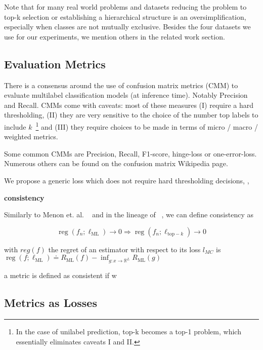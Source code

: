 Note that for many real world problems and datasets reducing the problem to top-k selection or establishing a hierarchical structure is an oversimplification, especially when classes are not mutually exclusive. Besides the four datasets we use for our experiments, we mention others in the related work section.

\subsection{Evaluation Metrics}
\label{section:background:metrics}

There is a consensus around the use of confusion matrix metrics (CMM) to evaluate multilabel classification models (at inference time). Notably Precision and Recall. CMMs come with caveats: most of these measures (I) require a hard thresholding, (II) they are very sensitive to the choice of the number top labels to include $k$~\footnote{In the case of unilabel prediction, top-k becomes a top-1 problem, which essentially eliminates caveats I and II.} and (III) they require choices to be made in terms of  micro / macro / weighted metrics.





Some common CMMs are Precision, Recall, F1-score, hinge-loss or one-error-loss. Numerous others can be found on the confusion matrix Wikipedia page.


We propose a generic loss which does not require hard thresholding decisions, , 


\textbf{consistency}

Similarly to Menon et. al. ~\citep{multilabelReduction} and in the lineage of ~\citep{consistency-surrogates, consistency-multiclassSVM, consistency-lossAnalysis}, we can define consistency as

\begin{equation}
\operatorname{reg}\left(f_{n} ; \ell_{\mathrm{ML}}\right) \rightarrow 0 \Longrightarrow \operatorname{reg}\left(f_{n} ; \ell_{\mathrm{top}-k}\right) \rightarrow 0
\end{equation}

with $reg(f)$ the regret of an estimator with respect to its loss $l_{MC}$ is $\operatorname{reg}\left(f ; \ell_{\mathrm{ML}}\right) \doteq R_{\mathrm{ML}}(f)-\inf _{g: x \rightarrow \mathbb{R}^{L}} R_{\mathrm{ML}}(g)$

a metric is defined as consistent if w


\subsection{Metrics as Losses}
\label{section:background:metricsAsLosses}

